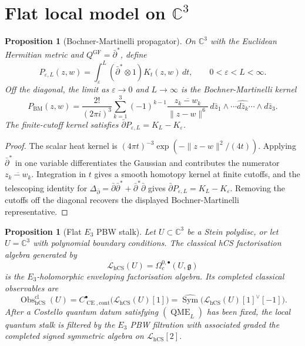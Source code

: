 \documentclass[11pt]{amsart}
\providecommand{\C}{\mathbb{C}}
\providecommand{\dbar}{\bar{\partial}}
\providecommand{\dbarstar}{\bar{\partial}^{\ast}}
\providecommand{\gfrak}{\mathfrak{g}}
\providecommand{\Sym}{\operatorname{Sym}}
\providecommand{\Obs}{\operatorname{Obs}}
\providecommand{\CE}{\operatorname{CE}}
\providecommand{\QME}{\operatorname{QME}}
\providecommand{\hCS}{\operatorname{hCS}}
\theoremstyle{plain}
\newtheorem{proposition}[theorem]{Proposition}
\theoremstyle{definition}
\theoremstyle{remark}
\begin{document}
\section{Flat local model on \texorpdfstring{$\C^3$}{C3}}
\label{sec:flat-c3}

\begin{proposition}[Bochner-Martinelli propagator]
\label{prop:bm-propagator}
On \(\C^3\) with the Euclidean Hermitian metric and
\(Q^{\mathrm{GF}}=\dbarstar\), define
\[
  P_{\varepsilon,L}(z,w)
  =
  \int_{\varepsilon}^{L}(\dbarstar\otimes1)K_t(z,w)\,dt ,
  \qquad
  0<\varepsilon<L<\infty .
\]
Off the diagonal, the limit as \(\varepsilon\to0\) and
\(L\to\infty\) is the Bochner-Martinelli kernel
\[
  P_{\mathrm{BM}}(z,w)
  =
  \frac{2!}{(2\pi i)^3}
  \sum_{k=1}^{3}(-1)^{k-1}
  \frac{\overline{z_k-w_k}}{\|z-w\|^6}\,
  d\bar z_1\wedge\cdots\widehat{d\bar z_k}\cdots\wedge d\bar z_3 .
\]
The finite-cutoff kernel satisfies \(\dbar P_{\varepsilon,L}=K_L-K_\varepsilon\).
\end{proposition}

\begin{proof}
The scalar heat kernel is
\((4\pi t)^{-3}\exp(-\|z-w\|^2/(4t))\).  Applying
\(\dbarstar\) in one variable differentiates the Gaussian and
contributes the numerator \(\overline{z_k-w_k}\).  Integration in
\(t\) gives a smooth homotopy kernel at finite cutoffs, and the
telescoping identity for
\(\Delta_{\dbar}=\dbar\dbarstar+\dbarstar\dbar\) gives
\(\dbar P_{\varepsilon,L}=K_L-K_\varepsilon\).  Removing the cutoffs
off the diagonal recovers the displayed Bochner-Martinelli
representative.
\end{proof}

\begin{proposition}[Flat \(E_3\) PBW stalk]
\label{prop:flat-e3-pbw-stalk}
Let \(U\subset\C^3\) be a Stein polydisc, or let \(U=\C^3\) with
polynomial boundary conditions.  The classical hCS factorisation
algebra generated by
\[
  \mathscr L_{\hCS}(U)=\Omega^{0,\bullet}_c(U,\gfrak)
\]
is the \(E_3\)-holomorphic enveloping factorisation algebra.  Its
completed classical observables are
\[
  \Obs^{\mathrm{cl}}_{\hCS}(U)
  =
  C^\bullet_{\CE,\mathrm{cont}}
  \bigl(\mathscr L_{\hCS}(U)[1]\bigr)
  =
  \widehat{\Sym}\bigl(\mathscr L_{\hCS}(U)[1]^\vee[-1]\bigr).
\]
After a Costello quantum datum satisfying \((\QME_L)\) has been fixed,
the local quantum stalk is filtered by the \(E_3\) PBW filtration with
associated graded the completed signed symmetric algebra on
\(\mathscr L_{\hCS}[2]\).
\end{proposition}
\end{document}
